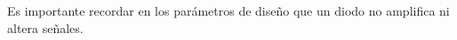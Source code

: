 \documentclass{article}
\begin{document}


Es importante recordar en los parámetros de diseño que un diodo no amplifica ni altera señales.\\





%
%
\end{document}
